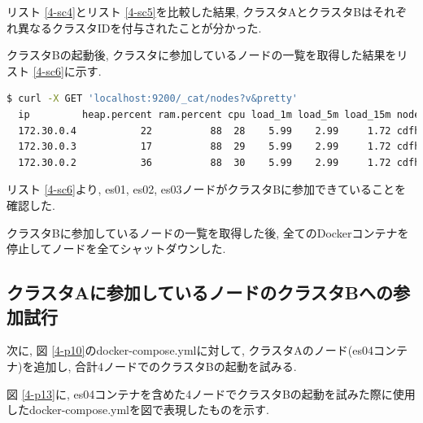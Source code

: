 リスト \ref{4-sc4}とリスト \ref{4-sc5}を比較した結果, クラスタAとクラスタBはそれぞれ異なるクラスタIDを付与されたことが分かった.

クラスタBの起動後, クラスタに参加しているノードの一覧を取得した結果をリスト \ref{4-sc6}に示す.

\begin{lstlisting}[language=bash, caption=クラスタBに参加しているノード一覧, label=4-sc6]
  $ curl -X GET 'localhost:9200/_cat/nodes?v&pretty'
  ip         heap.percent ram.percent cpu load_1m load_5m load_15m node.role   master name
  172.30.0.4           22          88  28    5.99    2.99     1.72 cdfhilmrstw -      es03
  172.30.0.3           17          88  29    5.99    2.99     1.72 cdfhilmrstw *      es02
  172.30.0.2           36          88  30    5.99    2.99     1.72 cdfhilmrstw -      es01
\end{lstlisting}

リスト \ref{4-sc6}より, es01, es02, es03ノードがクラスタBに参加できていることを確認した.

クラスタBに参加しているノードの一覧を取得した後, 全てのDockerコンテナを停止してノードを全てシャットダウンした.

\subsection{クラスタAに参加しているノードのクラスタBへの参加試行}

次に, 図 \ref{4-p10}のdocker-compose.ymlに対して, クラスタAのノード(es04コンテナ)を追加し, 合計4ノードでのクラスタBの起動を試みる.

図 \ref{4-p13}に, es04コンテナを含めた4ノードでクラスタBの起動を試みた際に使用したdocker-compose.ymlを図で表現したものを示す.

